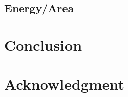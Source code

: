\documentclass[conference]{IEEEtran}
\begin{document}
\subsection{Energy/Area}



\section{Conclusion}


\section*{Acknowledgment}













\end{document}

